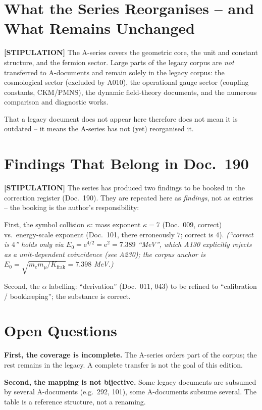 \section{What the Series Reorganises -- and What Remains Unchanged}

\textbf{[STIPULATION]} The A-series covers the geometric core, the unit and
constant structure, and the fermion sector. Large parts of the legacy corpus are
\emph{not} transferred to A-documents and remain solely in the legacy corpus: the
cosmological sector (excluded by A010), the operational gauge sector (coupling constants, CKM/PMNS), the dynamic field-theory
documents, and the numerous comparison and diagnostic works.

That a legacy document does not appear here therefore does not mean it is
outdated -- it means the A-series has not (yet) reorganised it.

\section{Findings That Belong in Doc.~190}

\textbf{[STIPULATION]} The series has produced two findings to be booked in the
correction register (Doc.~190). They are repeated here as \emph{findings}, not
as entries -- the booking is the author's responsibility:

First, the symbol collision $\kappa$: mass exponent $\kappa=7$ (Doc.~009, correct)
vs.\ energy-scale exponent (Doc.~101, there erroneously $7$; correct is $4$). \textit{(\enquote{correct is $4$} holds only via $E_0=\mathrm{e}^{4/2}=\mathrm{e}^2=7.389$ \enquote{MeV}, which A130 explicitly rejects as a unit-dependent coincidence (see A230); the corpus anchor is $E_0=\sqrt{m_em_\mu/K_\text{frak}}=7.398$ MeV.)}

Second, the $\alpha$ labelling: ``derivation'' (Doc.~011, 043) to be refined to
``calibration / bookkeeping''; the substance is correct.

\section{Open Questions}

\textbf{First, the coverage is incomplete.} The A-series orders part of the
corpus; the rest remains in the legacy. A complete transfer is not the goal of
this edition.

\textbf{Second, the mapping is not bijective.} Some legacy documents are subsumed
by several A-documents (e.g.\ 292, 101), some A-documents subsume several. The
table is a reference structure, not a renaming.

